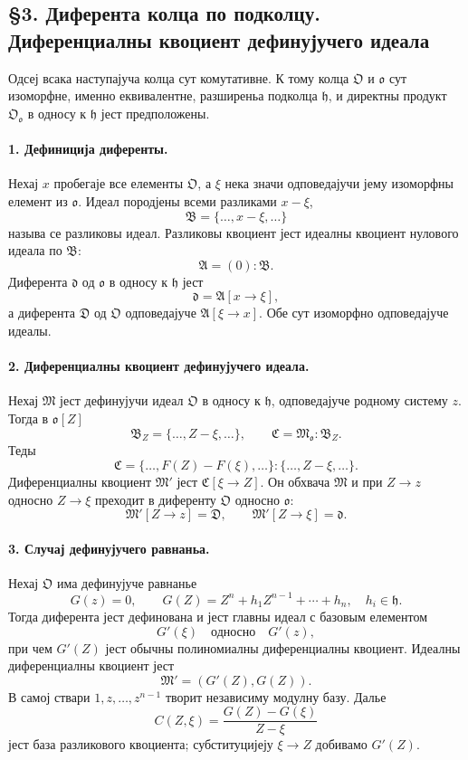 ﻿\documentclass[11pt]{article}
\begin{document}
\subsection*{§3. Диферента колца по подколцу. Диференциалны квоциент дефинујучего идеала}

Одсеј всака наступајуча колца сут комутативне. К тому колца \(\mathfrak O\) и \(\mathfrak o\) сут изоморфне, именно еквивалентне, разширеньа подколца \(\mathfrak h\), и директны продукт \(\mathfrak O_{\mathfrak o}\) в односу к \(\mathfrak h\) јест предположены.

\paragraph{1. Дефиниција диференты.}
Нехај \(x\) пробегаје все елементы \(\mathfrak O\), а \(\xi\) нека значи одповедајучи јему изоморфны елемент из \(\mathfrak o\). Идеал породјены всеми разликами \(x-\xi\),
\[
        \mathfrak B=\{\ldots,x-\xi,\ldots\}
\]
называ се разликовы идеал. Разликовы квоциент јест идеалны квоциент нулового идеала по \(\mathfrak B\):
\[
        \mathfrak A=(0):\mathfrak B.
\]
Диферента \(\mathfrak d\) од \(\mathfrak o\) в односу к \(\mathfrak h\) јест
\[
        \mathfrak d=\mathfrak A[x\to\xi],
\]
а диферента \(\mathfrak D\) од \(\mathfrak O\) одповедајуче \(\mathfrak A[\xi\to x]\). Обе сут изоморфно одповедајуче идеалы.

\paragraph{2. Диференциалны квоциент дефинујучего идеала.}
Нехај \(\mathfrak M\) јест дефинујучи идеал \(\mathfrak O\) в односу к \(\mathfrak h\), одповедајуче родному систему \(z\). Тогда в \(\mathfrak o[Z]\)
\[
        \mathfrak B_Z=\{\ldots,Z-\xi,\ldots\},
        \qquad
        \mathfrak C=\mathfrak M_{\mathfrak o}:\mathfrak B_Z.
\]
Теды
\[
        \mathfrak C=\{\ldots,F(Z)-F(\xi),\ldots\}:
        \{\ldots,Z-\xi,\ldots\}.
\]
Диференциалны квоциент \(\mathfrak M'\) јест \(\mathfrak C[\xi\to Z]\). Он обхвача \(\mathfrak M\) и при \(Z\to z\) односно \(Z\to\xi\) преходит в диференту \(\mathfrak O\) односно \(\mathfrak o\):
\[
        \mathfrak M'[Z\to z]=\mathfrak D,
        \qquad
        \mathfrak M'[Z\to \xi]=\mathfrak d.
\]

\paragraph{3. Случај дефинујучего равнаньа.}
Нехај \(\mathfrak O\) има дефинујуче равнанье
\[
        G(z)=0,\qquad
        G(Z)=Z^n+h_1Z^{n-1}+\cdots+h_n,
        \quad h_i\in\mathfrak h.
\]
Тогда диферента јест дефинована и јест главны идеал с базовым елементом
\[
        G'(\xi) \quad\text{односно}\quad G'(z),
\]
при чем \(G'(Z)\) јест обычны полиномиалны диференциалны квоциент. Идеалны диференциалны квоциент јест
\[
        \mathfrak M'=(G'(Z),G(Z)).
\]
В самој ствари \(1,z,\ldots,z^{n-1}\) творит независиму модулну базу. Далье
\[
        C(Z,\xi)=\frac{G(Z)-G(\xi)}{Z-\xi}
\]
јест база разликового квоциента; субституцијеју \(\xi\to Z\) добивамо \(G'(Z)\).
\end{document}
